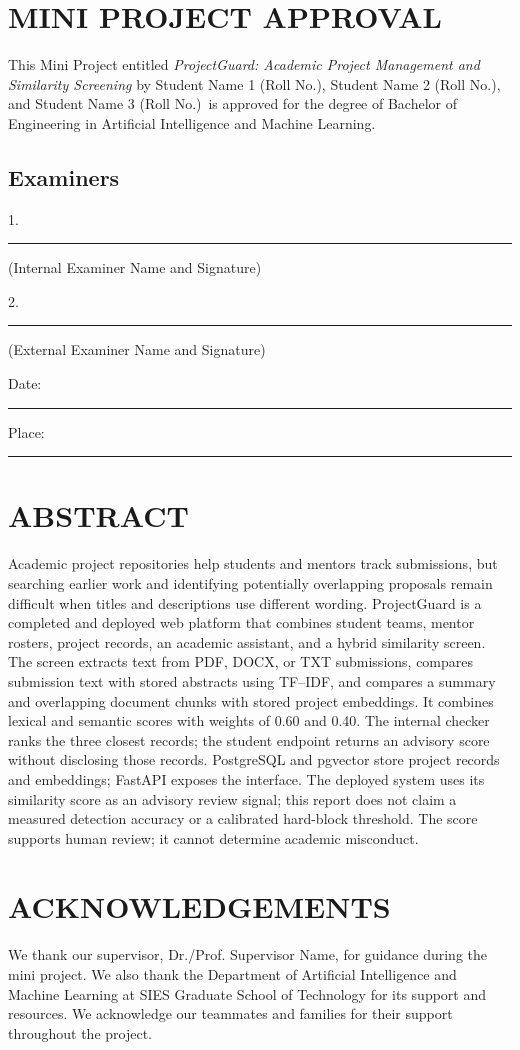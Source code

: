 \documentclass[12pt,a4paper]{report}
\newcommand{\projecttitle}{ProjectGuard: Academic Project Management and Similarity Screening}
\newcommand{\studentone}{Student Name 1 (Roll No.)}
\newcommand{\studenttwo}{Student Name 2 (Roll No.)}
\newcommand{\studentthree}{Student Name 3 (Roll No.)}
\newcommand{\supervisor}{Dr./Prof. Supervisor Name}
\begin{document}
\chapter*{MINI PROJECT APPROVAL}
\vspace{1.5cm}
This Mini Project entitled \emph{\projecttitle} by \studentone, \studenttwo, and \studentthree\ is approved for the degree of Bachelor of Engineering in Artificial Intelligence and Machine Learning.
\vspace{2cm}\section*{Examiners}\vspace{0.8cm}
1. \rule{8cm}{0.4pt}\par (Internal Examiner Name and Signature)\par\vspace{1.5cm}
2. \rule{8cm}{0.4pt}\par (External Examiner Name and Signature)\par
\vfill Date: \rule{4cm}{0.4pt}\hfill Place: \rule{4cm}{0.4pt}\clearpage
\chapter*{ABSTRACT}
Academic project repositories help students and mentors track submissions, but searching earlier work and identifying potentially overlapping proposals remain difficult when titles and descriptions use different wording. ProjectGuard is a completed and deployed web platform that combines student teams, mentor rosters, project records, an academic assistant, and a hybrid similarity screen. The screen extracts text from PDF, DOCX, or TXT submissions, compares submission text with stored abstracts using TF--IDF, and compares a summary and overlapping document chunks with stored project embeddings. It combines lexical and semantic scores with weights of 0.60 and 0.40. The internal checker ranks the three closest records; the student endpoint returns an advisory score without disclosing those records. PostgreSQL and pgvector store project records and embeddings; FastAPI exposes the interface. The deployed system uses its similarity score as an advisory review signal; this report does not claim a measured detection accuracy or a calibrated hard-block threshold. The score supports human review; it cannot determine academic misconduct.
\clearpage
\chapter*{ACKNOWLEDGEMENTS}
We thank our supervisor, \supervisor, for guidance during the mini project. We also thank the Department of Artificial Intelligence and Machine Learning at SIES Graduate School of Technology for its support and resources. We acknowledge our teammates and families for their support throughout the project.\clearpage
\end{document}
